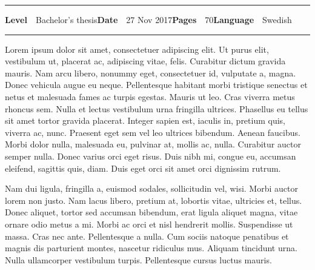 \begin{spacing}{.88}
{\vspace{-2.4mm}\rule{\textwidth}{.75pt}

{\fontsize{10.5pt}{10.5pt}\bfseries\sffamily\lsstyle Level}~~{\small Bachelor's thesis}\hfill{\fontsize{10.5pt}{10.5pt}\bfseries\sffamily\lsstyle Date}~~{\small 27 Nov 2017}\hfill{\fontsize{10.5pt}{10.5pt}\bfseries\sffamily\lsstyle Pages}~~{\small 70}\hfill{\fontsize{10.5pt}{10.5pt}\bfseries\sffamily\lsstyle Language}~~{\small Swedish}

\vspace{-2.4mm}\rule{\textwidth}{.75pt}

\vspace{6mm}

} %
\end{spacing}
\begin{spacing}{1.05}

\vspace{.8mm}

{\small
  Lorem ipsum dolor sit amet, consectetuer adipiscing elit. Ut purus
  elit, vestibulum ut, placerat ac, adipiscing vitae, felis. Curabitur
  dictum gravida mauris. Nam arcu libero, nonummy eget, consectetuer
  id, vulputate a, magna. Donec vehicula augue eu neque. Pellentesque
  habitant morbi tristique senectus et netus et malesuada fames ac
  turpis egestas. Mauris ut leo. Cras viverra metus rhoncus sem. Nulla
  et lectus vestibulum urna fringilla ultrices. Phasellus eu tellus
  sit amet tortor gravida placerat. Integer sapien est, iaculis in,
  pretium quis, viverra ac, nunc. Praesent eget sem vel leo ultrices
  bibendum. Aenean faucibus. Morbi dolor nulla, malesuada eu, pulvinar
  at, mollis ac, nulla. Curabitur auctor semper nulla.  Donec varius
  orci eget risus. Duis nibh mi, congue eu, accumsan eleifend,
  sagittis quis, diam. Duis eget orci sit amet orci dignissim rutrum.

  Nam dui ligula, fringilla a, euismod sodales, sollicitudin vel,
  wisi. Morbi auctor lorem non justo. Nam lacus libero, pretium at,
  lobortis vitae, ultricies et, tellus. Donec aliquet, tortor sed
  accumsan bibendum, erat ligula aliquet magna, vitae ornare odio
  metus a mi. Morbi ac orci et nisl hendrerit mollis. Suspendisse ut
  massa. Cras nec ante. Pellentesque a nulla.  Cum sociis natoque
  penatibus et magnis dis parturient montes, nascetur ridiculus
  mus. Aliquam tincidunt urna. Nulla ullamcorper vestibulum
  turpis. Pellentesque cursus luctus mauris.

}
\end{spacing}
